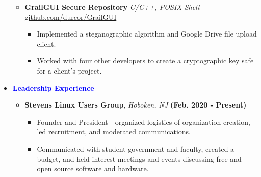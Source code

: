 \documentclass[11pt]{article}
\begin{document}
\begin{flushleft}
\begin{itemize}
\begin{itemize}
\begin{itemize}
                \end{itemize}
            \item \textbf{GrailGUI Secure Repository} \textit{C/C++, POSIX Shell} \hfill{\href{https://github.com/durcor/GrailGUI}{github.com/durcor/GrailGUI}}
                \begin{itemize}
                    \item Implemented a steganographic algorithm and Google Drive file upload client.
                    \item Worked with four other developers to create a cryptographic key safe for a client's project.
                \end{itemize}
        \end{itemize}
    \item[] \Large \textcolor{blue}{\textbf{Leadership Experience}} \normalsize
        \begin{itemize}
            \item \textbf{Stevens Linux Users Group}, \textit{Hoboken, NJ} \hfill{\textbf{(Feb. 2020 - Present)}}
                \begin{itemize}
                    \item Founder and President - organized logistics of organization creation, led recruitment, and moderated communications.
                    \item Communicated with student government and faculty, created a budget, and held interest meetings and events discussing free and open source software and hardware.
                \end{itemize}
        \end{itemize}
\end{itemize}

\end{flushleft}
\end{document}
